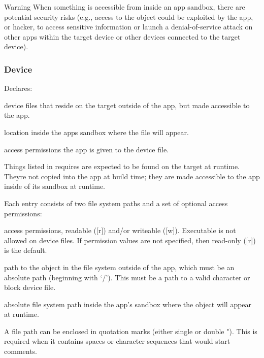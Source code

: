 \begin{DoxyWarning}{Warning}
When something is accessible from inside an app sandbox, there are potential security risks (e.\+g., access to the object could be exploited by the app, or hacker, to access sensitive information or launch a denial-\/of-\/service attack on other apps within the target device or other devices connected to the target device).
\end{DoxyWarning}
\hypertarget{def_files_adef_defFilesAdef_requiresDevice}{}\subsubsection{Device}\label{def_files_adef_defFilesAdef_requiresDevice}
Declares\+:
\begin{DoxyItemize}
\item device files that reside on the target outside of the app, but made accessible to the app.
\item location inside the app\textquotesingle{}s sandbox where the file will appear.
\item access permissions the app is given to the device file.
\end{DoxyItemize}

Things listed in {\ttfamily requires} are expected to be found on the target at runtime. They\textquotesingle{}re not copied into the app at build time; they are made accessible to the app inside of its sandbox at runtime.

Each entry consists of two file system paths and a set of optional access permissions\+:


\begin{DoxyItemize}
\item access permissions, readable (\mbox{[}r\mbox{]}) and/or writeable (\mbox{[}w\mbox{]}). Executable is not allowed on device files. If permission values are not specified, then read-\/only (\mbox{[}r\mbox{]}) is the default.
\item path to the object in the file system outside of the app, which must be an absolute path (beginning with ‘/’). This must be a path to a valid character or block device file.
\item absolute file system path inside the app’s sandbox where the object will appear at runtime.
\end{DoxyItemize}

A file path can be enclosed in quotation marks (either single \textquotesingle{} or double "). This is required when it contains spaces or character sequences that would start comments.

